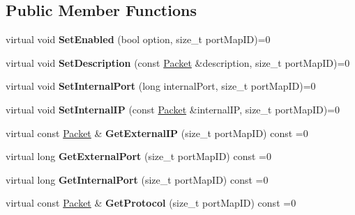 \subsection*{Public Member Functions}
\begin{DoxyCompactItemize}
\item 
\hypertarget{class_upnp_nat_port_map_a43787b84742ea812432fb79fa23e4e0e}{
virtual void {\bfseries SetEnabled} (bool option, size\_\-t portMapID)=0}
\label{class_upnp_nat_port_map_a43787b84742ea812432fb79fa23e4e0e}

\item 
\hypertarget{class_upnp_nat_port_map_a3ef44edfccd4429ab61ad37a3acb5385}{
virtual void {\bfseries SetDescription} (const \hyperlink{class_packet}{Packet} \&description, size\_\-t portMapID)=0}
\label{class_upnp_nat_port_map_a3ef44edfccd4429ab61ad37a3acb5385}

\item 
\hypertarget{class_upnp_nat_port_map_a22c139eafed43f62ba0b65e1fba25d61}{
virtual void {\bfseries SetInternalPort} (long internalPort, size\_\-t portMapID)=0}
\label{class_upnp_nat_port_map_a22c139eafed43f62ba0b65e1fba25d61}

\item 
\hypertarget{class_upnp_nat_port_map_ac4958e0dabd3346824d7387aaf90358e}{
virtual void {\bfseries SetInternalIP} (const \hyperlink{class_packet}{Packet} \&internalIP, size\_\-t portMapID)=0}
\label{class_upnp_nat_port_map_ac4958e0dabd3346824d7387aaf90358e}

\item 
\hypertarget{class_upnp_nat_port_map_a8717ac7430ec355986b4d4889375d997}{
virtual const \hyperlink{class_packet}{Packet} \& {\bfseries GetExternalIP} (size\_\-t portMapID) const =0}
\label{class_upnp_nat_port_map_a8717ac7430ec355986b4d4889375d997}

\item 
\hypertarget{class_upnp_nat_port_map_a2dabdd3086286134675423247947f148}{
virtual long {\bfseries GetExternalPort} (size\_\-t portMapID) const =0}
\label{class_upnp_nat_port_map_a2dabdd3086286134675423247947f148}

\item 
\hypertarget{class_upnp_nat_port_map_a00ae8d60c62f75c0b335d91cfb1440e9}{
virtual long {\bfseries GetInternalPort} (size\_\-t portMapID) const =0}
\label{class_upnp_nat_port_map_a00ae8d60c62f75c0b335d91cfb1440e9}

\item 
\hypertarget{class_upnp_nat_port_map_a0dce9e4385cba3fd883c13dd80952f3b}{
virtual const \hyperlink{class_packet}{Packet} \& {\bfseries GetProtocol} (size\_\-t portMapID) const =0}
\label{class_upnp_nat_port_map_a0dce9e4385cba3fd883c13dd80952f3b}


\end{DoxyCompactItemize}
